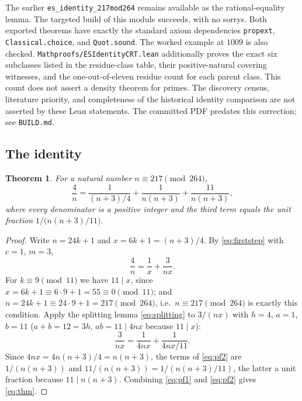 \documentclass[11pt,a4paper]{article}
\newtheorem{theorem}{Theorem}
\theoremstyle{definition}
\begin{document}
The earlier \texttt{es\_identity\_217mod264} remains available as the
rational-equality lemma. The targeted build of this module succeeds,
with no sorrys. Both exported theorems have exactly the standard axiom
dependencies \texttt{propext}, \texttt{Classical.choice}, and
\texttt{Quot.sound}. The worked example at $1009$ is also checked.
\texttt{Mathproofs/ESIdentityCRT.lean} additionally proves the exact six
subclasses listed in the residue-class table, their positive-natural covering witnesses,
and the one-out-of-eleven residue count for each parent class. This count
does not assert a density theorem for primes.
The discovery census, literature priority, and completeness of the
historical identity comparison are not asserted by these Lean statements.
The committed PDF predates this correction; see \texttt{BUILD.md}.

\subsection{The identity}

\begin{theorem}
  \label{thm:main}
  For a natural number $n \equiv 217 \pmod{264}$,
  \begin{equation}
    \label{eq:thm}
    \frac{4}{n} = \frac{1}{(n+3)/4} + \frac{1}{n(n+3)}
                 + \frac{11}{n(n+3)},
  \end{equation}
  where every denominator is a positive integer and the third term equals
  the unit fraction $1/\bigl(n(n+3)/11\bigr)$.
\end{theorem}

\begin{proof}
  Write $n = 24k+1$ and $x = 6k+1 = (n+3)/4$. By \eqref{eq:firststep} with
  $c=1$, $m=3$,
  \begin{equation}
    \label{eq:pf1}
    \frac{4}{n} = \frac{1}{x} + \frac{3}{nx}.
  \end{equation}
  For $k \equiv 9 \pmod{11}$ we have $11 \mid x$, since
  $x = 6k+1 \equiv 6\cdot 9 + 1 = 55 \equiv 0 \pmod{11}$; and
  $n = 24k+1 \equiv 24\cdot 9 + 1 = 217 \pmod{264}$, i.e.\ $n \equiv 217
  \pmod{264}$ is exactly this condition. Apply the splitting lemma
  \eqref{eq:splitting} to $3/(nx)$ with $h=4$, $a=1$, $b=11$
  ($a+b = 12 = 3h$, $ab = 11 \mid 4nx$ because $11 \mid x$):
  \begin{equation}
    \label{eq:pf2}
    \frac{3}{nx} = \frac{1}{4nx} + \frac{1}{4nx/11}.
  \end{equation}
  Since $4nx = 4n(n+3)/4 = n(n+3)$, the terms of \eqref{eq:pf2} are
  $1/(n(n+3))$ and $11/(n(n+3)) = 1/(n(n+3)/11)$, the latter a unit
  fraction because $11 \mid n(n+3)$. Combining \eqref{eq:pf1} and
  \eqref{eq:pf2} gives \eqref{eq:thm}. \qedhere
\end{proof}
\end{document}
